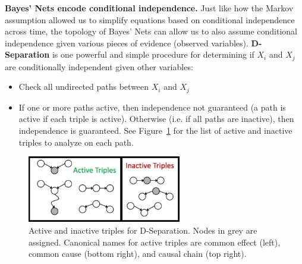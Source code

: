 \documentclass[11pt]{article}
\begin{document}
\textbf{Bayes' Nets encode conditional independence.} Just like how the Markov assumption allowed us to simplify equations based on conditional independence across time, the topology of Bayes' Nets can allow us to also assume conditional independence given various pieces of evidence (observed variables). \textbf{D-Separation} is one powerful and simple procedure for determining if $X_i$ and  $X_j$ are conditionally independent given other variables:
\begin{itemize}
    \item Check all undirected paths between $X_i$ and $X_j$
    \item If one or more paths active, then independence not guaranteed (a path is active if each triple is active). Otherwise (i.e. if all paths are inactive), then independence is guaranteed. See Figure~\ref{fig:triples} for the list of active and inactive triples to analyze on each path.
\end{itemize}

\begin{figure}[ht]
    \centering
    \includegraphics[width=0.6\textwidth]{figs/triples.png}
    \caption{Active and inactive triples for D-Separation. Nodes in grey are assigned. Canonical names for active triples are common effect (left), common cause (bottom right), and causal chain (top right).}
    \label{fig:triples}
\end{figure}
\end{document}
